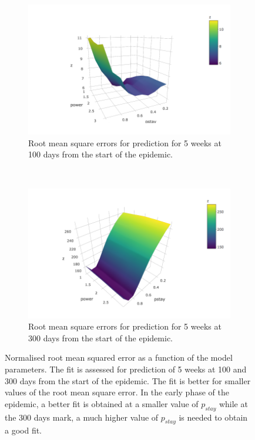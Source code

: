 \documentclass[11pt,]{article}
\begin{document}
\begin{figure}
  \centering
  \begin{subfigure}[b]{0.4\textwidth}
    \includegraphics[]{ms6-figures/rms-100-2}
    \caption{Root mean square errors for prediction for 5 weeks at 100 days from the start of the epidemic.}
    \label{fig:rms-100}
\end{subfigure}
~
  \begin{subfigure}[b]{0.4\textwidth}
    \includegraphics[]{ms6-figures/rms-300-2}
    \caption{Root mean square errors for prediction for 5 weeks at 300 days from the start of the epidemic.}    
    \label{fig:rms-300}
\end{subfigure}
  \caption[RMS as a function of model parameters]{Normalised root mean
    squared error as a function of the model parameters. The fit is
    assessed for prediction of 5 weeks at 100 and 300 days from the start of
    the epidemic. The fit is better for smaller values of the root
    mean square error. In the early phase of the epidemic, a better
    fit is obtained at a smaller value of $p_{stay}$ while at the 300
    days mark, a much higher value of $p_{stay}$ is needed to obtain a
  good fit.}
  \label{fig:rms}
\end{figure}
\end{document}
